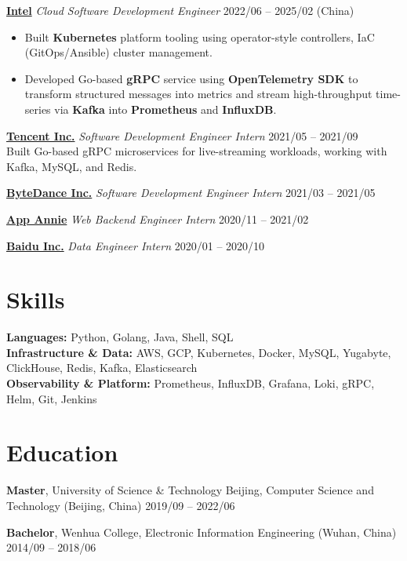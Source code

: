 \documentclass[11pt,a4paper]{article}
\begin{document}
\vspace{5pt}

\noindent
\href{https://www.intel.com}{\textbf{Intel}} \hfill \textit{Cloud Software Development Engineer} \hfill 2022/06 -- 2025/02 (China)

\vspace{2pt}
\begin{itemize}
  \item Built \textbf{Kubernetes} platform tooling using operator-style controllers, IaC (GitOps/Ansible) cluster management.
  \item Developed Go-based \textbf{gRPC} service using \textbf{OpenTelemetry SDK} to transform structured messages into metrics and stream high-throughput time-series via \textbf{Kafka} into \textbf{Prometheus} and \textbf{InfluxDB}.
\end{itemize}

\vspace{4pt}

\noindent
\href{https://www.tencent.com}{\textbf{Tencent Inc.}} \hfill \textit{Software Development Engineer Intern} \hfill 2021/05 -- 2021/09 \\
Built Go-based gRPC microservices for live-streaming workloads, working with Kafka, MySQL, and Redis.

\vspace{2pt}
\noindent
\href{https://www.bytedance.com}{\textbf{ByteDance Inc.}} \hfill \textit{Software Development Engineer Intern} \hfill 2021/03 -- 2021/05

\vspace{1pt}
\noindent
\href{https://www.data.ai}{\textbf{App Annie}} \hfill \textit{Web Backend Engineer Intern} \hfill 2020/11 -- 2021/02

\vspace{0pt}
\noindent
\href{https://www.baidu.com}{\textbf{Baidu Inc.}} \hfill \textit{Data Engineer Intern} \hfill 2020/01 -- 2020/10

\section*{Skills}
\textbf{Languages:} Python, Golang, Java, Shell, SQL \\
\textbf{Infrastructure \& Data:} AWS, GCP, Kubernetes, Docker, MySQL, Yugabyte, ClickHouse, Redis, Kafka, Elasticsearch \\
\textbf{Observability \& Platform:} Prometheus, InfluxDB, Grafana, Loki, gRPC, Helm, Git, Jenkins

\section*{Education}
\textbf{Master}, {\small University of Science \& Technology Beijing, Computer Science and Technology (Beijing, China)} \hfill {\small 2019/09 -- 2022/06}

\vspace{4pt}
\noindent
\textbf{Bachelor}, {\small Wenhua College, Electronic Information Engineering (Wuhan, China)} \hfill {\small 2014/09 -- 2018/06}
\end{document}
